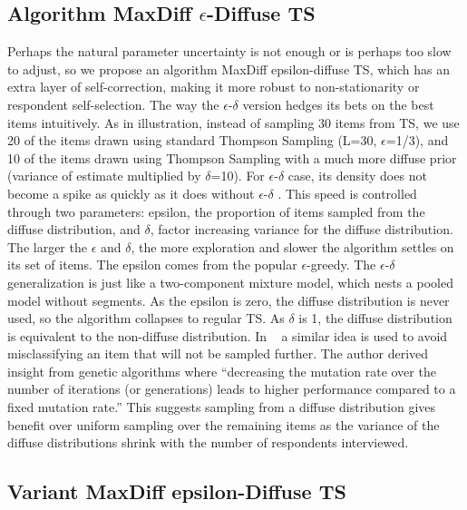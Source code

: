 \documentclass[nonblindrev]{informs3}
\begin{document}
\subsection{Algorithm MaxDiff $\epsilon$-Diffuse TS}
Perhaps the natural parameter uncertainty is not enough or is perhaps too slow to adjust, so we propose an algorithm MaxDiff epsilon-diffuse TS, which has an extra layer of self-correction, making it more robust to non-stationarity or respondent self-selection. 
The way the $\epsilon$-$\delta$ version hedges its bets on the best items intuitively. As in illustration, instead of sampling 30 items from TS, we use 20 of the items drawn using standard Thompson Sampling (L=30, $\epsilon$=1/3), and 10 of the items drawn using Thompson Sampling with a much more diffuse prior (variance of estimate multiplied by $\delta$=10).
For $\epsilon$-$\delta$ case, its density does not become a spike as quickly as it does without $\epsilon$-$\delta$ . This speed is controlled through two parameters: epsilon, the proportion of items sampled from the diffuse distribution, and $\delta$, factor increasing variance for the diffuse distribution.  The larger the $\epsilon$ and $\delta$, the more exploration and slower the algorithm settles on its set of items. The epsilon comes from the popular $\epsilon$-greedy.
The $\epsilon$-$\delta$  generalization is just like a two-component mixture model, which nests a pooled model without segments. As the epsilon is zero, the diffuse distribution is never used, so the algorithm collapses to regular TS. As $\delta$ is 1, the diffuse distribution is equivalent to the non-diffuse distribution.
In ~\cite{toubia2007adaptive} a similar idea is used to avoid misclassifying an item that will not be sampled further. The author derived insight from genetic algorithms where ``decreasing the mutation rate over the number of iterations (or generations) leads to higher performance compared to a fixed mutation rate.'' This suggests sampling from a diffuse distribution gives benefit over uniform sampling over the remaining items as the variance of the diffuse distributions shrink with the number of respondents interviewed.

\subsection{Variant MaxDiff epsilon-Diffuse TS}
\end{document}
